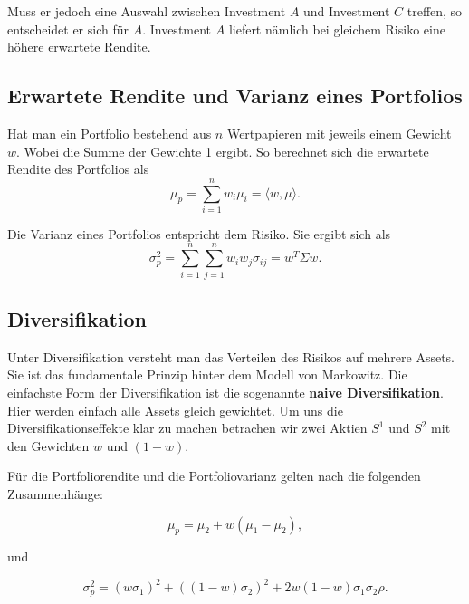 \documentclass[parskip=half]{scrartcl}
\begin{document}
	Muss er jedoch eine Auswahl zwischen Investment $A$ und Investment $C$ treffen, so entscheidet er sich für $A$. Investment $A$ liefert nämlich bei gleichem Risiko eine höhere erwartete Rendite.
	
	\clearpage
	
	\subsection{Erwartete Rendite und Varianz eines Portfolios}
	Hat man ein Portfolio bestehend aus $n$ Wertpapieren mit jeweils einem Gewicht $w$. Wobei die Summe der Gewichte 1 ergibt. So berechnet sich die erwartete Rendite des Portfolios als  \\
	
	\begin{equation}
		\mu_p = \sum_{i=1}^{n} w_i \mu_i = \langle w, \mu \rangle . \label{eq:portfoliorendite}
	\end{equation}
	
	Die Varianz eines Portfolios entspricht dem Risiko. Sie ergibt sich als \\
	
	\begin{equation}
		\sigma_p^2 = \sum_{i=1}^{n} \sum_{j=1}^{n} w_i w_j \sigma_{ij} = w^T \Sigma w . \label{eq:portfoliovarianz}
	\end{equation}
	
	
	\subsection{Diversifikation}
	Unter Diversifikation versteht man das Verteilen des Risikos auf mehrere Assets. Sie ist das fundamentale Prinzip hinter dem Modell von Markowitz. Die einfachste Form der Diversifikation ist die sogenannte \textbf{naive Diversifikation}. Hier werden einfach alle Assets gleich gewichtet. 
	Um uns die Diversifikationseffekte klar zu machen betrachen wir zwei Aktien $S^1$ und $S^2$ mit den Gewichten $w$ und $(1-w)$.
	
	Für die Portfoliorendite und die Portfoliovarianz gelten nach \textcite[22]{Kremer} die folgenden Zusammenhänge:
	
	\begin{equation}
		\mu_p = \mu_2 + w(\mu_1 - \mu_2) ,
	\end{equation}
	
	und
	
	\begin{equation}
		\sigma_p^2 = (w \sigma_1)^2 + ((1 - w) \sigma_2)^2 + 2w(1 - w)\sigma_1 \sigma_2 \rho .
	\end{equation}
	
\end{document}
